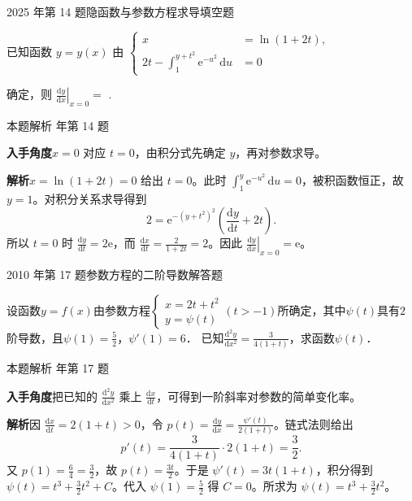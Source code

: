 \documentclass[UTF8,zihao=-4,fontset=fandol]{ctexart}
\newcommand{\blank}{\underline{\hspace{5em}}}
\newcommand{\QuestionPage}[6]{%
  \par\noindent\begin{minipage}{\linewidth}
  \raggedright
  {\small\textcolor{black!60}{#3\quad #5}\hfill\textcolor{accent}{#2}}\par\smallskip}
\newcommand{\QuestionEnd}{\end{minipage}\par\medskip}
\newcommand{\QuestionPage}[6]{%
  \clearpage
  {\small\textcolor{accent}{#1\hfill #2}}\par\medskip
  {\small\textcolor{black!60}{#3\quad #5\hfill #6}}\par\vspace{9bp}}
\newcommand{\QuestionEnd}{}
\newenvironment{QuestionSolution}[1]{%
  \clearpage
  {\small\textcolor{black!60}{本题解析\quad #1}}\par\medskip
}{\par\clearpage}
\begin{document}
\QuestionPage{2.2 求导的基本法则}{填空题}{2025 年第 14 题}{2}{隐函数与参数方程求导}{081 / 234}
已知函数 \(y = y\left( x \right)\) 由 \(\left\{ \begin{aligned} x &= \ln \left( 1 + 2t \right), \\ 2t - \int_{1}^{y + t^{2}} \mathrm{e}^{-u^{2}} \,\mathrm{d} u &= 0 \end{aligned} \right.\)

确定，则 \(\left. \frac{\mathrm{d} y}{\mathrm{d} x} \right|_{x = 0} =\) \blank{}.
\QuestionEnd

\begin{QuestionSolution}{2025 年第 14 题}
\textbf{入手角度}\quad \(x=0\) 对应 \(t=0\)，由积分式先确定 \(y\)，再对参数求导。

\textbf{解析}\quad \(x=\ln(1+2t)=0\) 给出 \(t=0\)。此时 \(\int_1^y \mathrm{e}^{-u^2}\,\mathrm{d}u=0\)，被积函数恒正，故 \(y=1\)。对积分关系求导得到
\[
2=\mathrm{e}^{-(y+t^2)^2}\left(\frac{\mathrm{d}y}{\mathrm{d}t}+2t\right).
\]
所以 \(t=0\) 时 \(\frac{\mathrm{d}y}{\mathrm{d}t}=2\mathrm{e}\)，而 \(\frac{\mathrm{d}x}{\mathrm{d}t}=\frac{2}{1+2t}=2\)。因此 \(\boxed{\left.\frac{\mathrm{d}y}{\mathrm{d}x}\right|_{x=0}=\mathrm{e}}\)。
\end{QuestionSolution}

\QuestionPage{2.2 求导的基本法则}{解答题}{2010 年第 17 题}{3}{参数方程的二阶导数}{082 / 234}
设函数$y = f(x)$由参数方程$\begin{cases}
  x = 2t + t^2 \\
  y = \psi(t)
\end{cases}(t > - 1)$所确定，其中$\psi (t)$具有$2$阶导数，且$\psi (1) = \frac{5}{2}$，$\psi'(1) = 6$．
已知$\frac{\mathrm{d}^2y}{\mathrm{d} x^2} = \frac{3}{4(1 + t)}$，求函数$\psi (t)$．
\QuestionEnd

\begin{QuestionSolution}{2010 年第 17 题}
\textbf{入手角度}\quad 把已知的 \(\frac{\mathrm{d}^2y}{\mathrm{d}x^2}\) 乘上 \(\frac{\mathrm{d}x}{\mathrm{d}t}\)，可得到一阶斜率对参数的简单变化率。

\textbf{解析}\quad 因 \(\frac{\mathrm{d}x}{\mathrm{d}t}=2(1+t)>0\)，令 \(p(t)=\frac{\mathrm{d}y}{\mathrm{d}x}=\frac{\psi'(t)}{2(1+t)}\)。链式法则给出
\[
p'(t)=\frac{3}{4(1+t)}\cdot2(1+t)=\frac32.
\]
又 \(p(1)=\frac{6}{4}=\frac{3}{2}\)，故 \(p(t)=\frac{3t}{2}\)。于是 \(\psi'(t)=3t(1+t)\)，积分得到 \(\psi(t)=t^3+\tfrac32t^2+C\)。代入 \(\psi(1)=\frac{5}{2}\) 得 \(C=0\)。所求为 \(\boxed{\psi(t)=t^3+\tfrac32t^2}\)。
\end{QuestionSolution}
\end{document}
